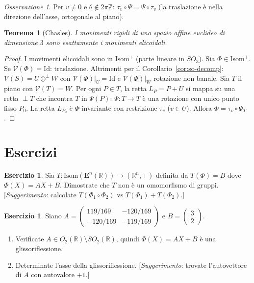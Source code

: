 \documentclass[11pt, a4paper]{book}
\theoremstyle{definition}
\newtheorem{esercizio}[definizione]{Esercizio}
\theoremstyle{plain}
\newtheorem{teorema}[definizione]{Teorema}
\theoremstyle{remark}
\newtheorem{osservazione}[definizione]{Osservazione}
\newcommand{\Z}{\mathbb{Z}}
\newcommand{\R}{\mathbb{R}}
\newcommand{\Id}{\mathrm{Id}}
\begin{document}
\begin{osservazione}
Per $v\neq 0$ e $\theta \notin 2\pi\Z$: $\tau_v \circ \Psi = \Psi \circ \tau_v$ (la traslazione è nella direzione dell'asse, ortogonale al piano).
\end{osservazione}

\begin{teorema}[Chasles]
\label{thm:chasles}
I movimenti rigidi di uno spazio affine euclideo di dimensione $3$ sono esattamente i movimenti elicoidali.
\end{teorema}

\begin{proof}
I movimenti elicoidali sono in $\mathrm{Isom}^+$ (parte lineare in $SO_3$). Sia $\Phi \in \mathrm{Isom}^+$. Se $\mathcal{V}(\Phi)=\Id$: traslazione. Altrimenti per il Corollario~\ref{cor:so-decomp}: $\mathcal{V}(S)=U\oplus^\perp W$ con $\mathcal{V}(\Phi)|_U=\Id$ e $\mathcal{V}(\Phi)|_W$ rotazione non banale. Sia $T$ il piano con $\mathcal{V}(T)=W$. Per ogni $P\in T$, la retta $L_P=P+U$ si mappa su una retta $\perp T$ che incontra $T$ in $\Psi(P)$: $\Psi \colon T\to T$ è una rotazione con unico punto fisso $P_0$. La retta $L_{P_0}$ è $\Phi$-invariante con restrizione $\tau_v$ ($v\in U$). Allora $\Phi = \tau_v \circ \Psi_T$.
\end{proof}

\section*{Esercizi}

\begin{esercizio}
Sia $T \colon \mathrm{Isom}(\mathbf{E}^n(\R)) \to (\R^n,+)$ definita da $T(\Phi)=B$ dove $\Phi(X)=AX+B$. Dimostrate che $T$ non è un omomorfismo di gruppi. [\emph{Suggerimento}: calcolate $T(\Phi_1\circ\Phi_2)$ vs $T(\Phi_1)+T(\Phi_2)$.]
\end{esercizio}

\begin{esercizio}
Siano $A = \begin{pmatrix}119/169&-120/169\\-120/169&-119/169\end{pmatrix}$ e $B = \begin{pmatrix}3\\2\end{pmatrix}$.
\begin{enumerate}
  \item Verificate $A \in O_2(\R)\setminus SO_2(\R)$, quindi $\Phi(X)=AX+B$ è una glissoriflessione.
  \item Determinate l'asse della glissoriflessione. [\emph{Suggerimento}: trovate l'autovettore di $A$ con autovalore $+1$.]
\end{enumerate}
\end{esercizio}
\end{document}
